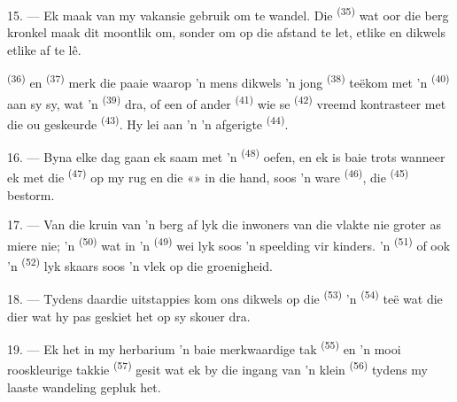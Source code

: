 \VUsaut{3.0mm}
\VUsaut{3.0mm}

15. --- Ek maak van my vakansie gebruik om  te wandel. Die 
\textsuperscript{(35)} wat oor die berg kronkel maak dit moontlik om, sonder om op die
afstand te let, etlike  en dikwels etlike  af te
lê.

 \textsuperscript{(36)} en  \textsuperscript{(37)} merk
die paaie waarop 'n mens dikwels 'n jong  \textsuperscript{(38)}
teëkom met 'n  \textsuperscript{(40)} aan sy sy, wat 'n 
\textsuperscript{(39)} dra, of een of ander  \textsuperscript{(41)} wie
se  \textsuperscript{(42)} vreemd kontrasteer met die ou geskeurde
 \textsuperscript{(43)}. Hy lei aan 'n  'n afgerigte
 \textsuperscript{(44)}.

\VUsaut{3.0mm}

16. --- Byna elke dag gaan ek saam met 'n  \textsuperscript{(48)}
 oefen, en ek is baie trots wanneer ek met die 
\textsuperscript{(47)} op my rug en die «» in die hand, soos 'n ware
 \textsuperscript{(46)}, die  \textsuperscript{(45)}
bestorm.

17. --- Van die kruin van 'n berg af lyk die inwoners van die vlakte nie groter as miere
nie; 'n  \textsuperscript{(50)} wat in 'n 
\textsuperscript{(49)} wei lyk soos 'n speelding vir kinders. 'n 
\textsuperscript{(51)} of ook 'n  \textsuperscript{(52)} lyk skaars
soos 'n vlek op die groenigheid.

18. --- Tydens daardie uitstappies kom ons dikwels op die 
\textsuperscript{(53)} 'n  \textsuperscript{(54)} teë wat die dier wat
hy pas geskiet het op sy skouer dra.

19. --- Ek het in my herbarium 'n baie merkwaardige tak 
\textsuperscript{(55)} en 'n mooi rooskleurige takkie 
\textsuperscript{(57)} gesit wat ek by die ingang van 'n klein 
\textsuperscript{(56)} tydens my laaste wandeling gepluk het.

\VUsaut{3.0mm}
\VUsaut{3.0mm}

